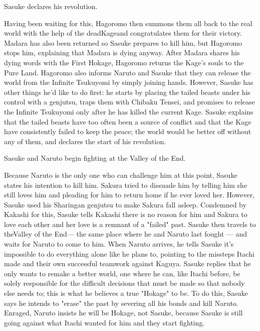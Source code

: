 \documentclass[a4paper,12pt]{article}
\begin{document}
Sasuke declares his revolution.\\ \par \vspace{0.5cm}

Having been waiting for this, Hagoromo then summons them all back to the real world with the help of the deadKageand congratulates them for their victory. Madara has also been returned so Sasuke prepares to kill him, but Hagoromo stops him, explaining that Madara is dying anyway. After Madara shares his dying words with the First Hokage, Hagoromo returns the Kage's souls to the Pure Land. Hagoromo also informs Naruto and Sasuke that they can release the world from the Infinite Tsukuyomi by simply joining hands. However, Sasuke has other things he'd like to do first: he starts by placing the tailed beasts under his control with a genjutsu, traps them with Chibaku Tensei, and promises to release the Infinite Tsukuyomi only after he has killed the current Kage. Sasuke explains that the tailed beasts have too often been a source of conflict and that the Kage have consistently failed to keep the peace; the world would be better off without any of them, and declares the start of his revolution.\\ \par \vspace{0.5cm}

Sasuke and Naruto begin fighting at the Valley of the End.\\ \par \vspace{0.5cm}

Because Naruto is the only one who can challenge him at this point, Sasuke states his intention to kill him. Sakura tried to dissuade him by telling him she still loves him and pleading for him to return home if he ever loved her. However, Sasuke used his Sharingan genjutsu to make Sakura fall asleep. Condemned by Kakashi for this, Sasuke tells Kakashi there is no reason for him and Sakura to love each other and her love is a remnant of a "failed" past. Sasuke then travels to theValley of the End— the same place where he and Naruto last fought — and waits for Naruto to come to him. When Naruto arrives, he tells Sasuke it's impossible to do everything alone like he plans to, pointing to the missteps Itachi made and their own successful teamwork against Kaguya. Sasuke replies that he only wants to remake a better world, one where he can, like Itachi before, be solely responsible for the difficult decisions that must be made so that nobody else needs to; this is what he believes a true "Hokage" to be. To do this, Sasuke says he intends to "erase" the past by severing all his bonds and kill Naruto. Enraged, Naruto insists he will be Hokage, not Sasuke, because Sasuke is still going against what Itachi wanted for him and they start fighting.\\ \par \vspace{0.5cm}
\end{document}
